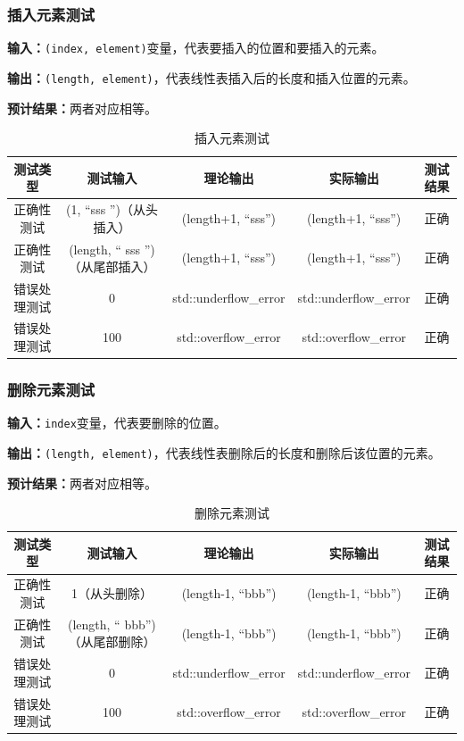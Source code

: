 \subsubsection{插入元素测试}
\textbf{输入：}\texttt{(index, element)}变量，代表要插入的位置和要插入的元素。
\par
\textbf{输出：}\texttt{(length, element)}，代表线性表插入后的长度和插入位置的元素。
\par
\textbf{预计结果：}两者对应相等。
\begin{table}[h]
    \centering
    \caption{插入元素测试}
    \begin{tabular}{@{}ccccc@{}}
        \toprule
        \multicolumn{1}{c}{测试类型}    & \multicolumn{1}{c}{测试输入} & \multicolumn{1}{c}{理论输出} & \multicolumn{1}{c}{实际输出} &
        \multicolumn{1}{c}{测试结果} \\ \midrule
        \multicolumn{1}{c|}{正确性测试}  & (1, ``sss '')（从头插入）&(length+1, ``sss'')&(length+1, ``sss'')&正确\\
        \multicolumn{1}{c|}{正确性测试}  & (length, `` sss '')（从尾部插入）&(length+1, ``sss'')&(length+1, ``sss'')&正确\\
        \multicolumn{1}{c|}{错误处理测试} & 0& std::underflow\_error& std::underflow\_error& 正确\\
        \multicolumn{1}{c|}{错误处理测试} & 100& std::overflow\_error& std::overflow\_error& 正确\\ \bottomrule
    \end{tabular}
    \label{tab:inserttest1}
\end{table}

\subsubsection{删除元素测试}
\textbf{输入：}\texttt{index}变量，代表要删除的位置。
\par
\textbf{输出：}\texttt{(length, element)}，代表线性表删除后的长度和删除后该位置的元素。
\par
\textbf{预计结果：}两者对应相等。
\begin{table}[h]
    \centering
    \caption{删除元素测试}
    \begin{tabular}{@{}ccccc@{}}
        \toprule
        \multicolumn{1}{c}{测试类型}    & \multicolumn{1}{c}{测试输入} & \multicolumn{1}{c}{理论输出} & \multicolumn{1}{c}{实际输出} &
        \multicolumn{1}{c}{测试结果} \\ \midrule
        \multicolumn{1}{c|}{正确性测试}  & 1（从头删除）&(length-1, ``bbb'')&(length-1, ``bbb'')&正确\\
        \multicolumn{1}{c|}{正确性测试}  & (length, `` bbb'')（从尾部删除）&(length-1, ``bbb'')&(length-1, ``bbb'')&正确\\
        \multicolumn{1}{c|}{错误处理测试} & 0& std::underflow\_error& std::underflow\_error& 正确\\
        \multicolumn{1}{c|}{错误处理测试} & 100& std::overflow\_error& std::overflow\_error& 正确\\ \bottomrule
    \end{tabular}
    \label{tab:deletetest1}
\end{table}


